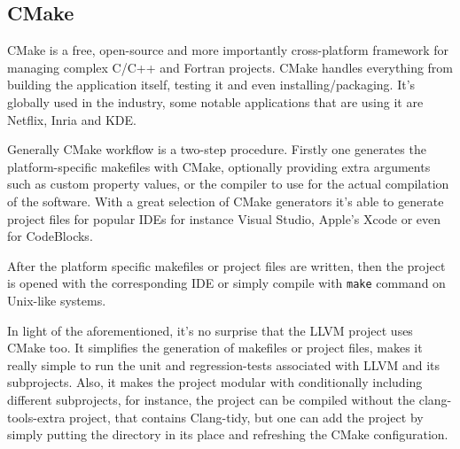\subsection{CMake}
\par CMake is a free, open-source and more importantly cross-platform framework for managing complex C/C++ and Fortran projects. CMake handles everything from building the application itself, testing it and even installing/packaging. It's globally used in the industry, some notable applications that are using it are Netflix, Inria and KDE\cite{cmake_homepage}. \medskip
\par Generally CMake workflow is a two-step procedure. Firstly one generates the platform-specific makefiles with CMake, optionally providing extra arguments such as custom property values, or the compiler to use for the actual compilation of the software. With a great selection of CMake generators it's able to generate project files for popular IDEs for instance Visual Studio, Apple's Xcode or even for CodeBlocks\cite{cmake_generator_doc}.
\par After the platform specific makefiles or project files are written, then the project is opened with the corresponding IDE or simply compile with \verb|make| command on Unix-like systems.
\par In light of the aforementioned, it's no surprise that the LLVM project uses CMake too. It simplifies the generation of makefiles or project files, makes it really simple to run the unit and regression-tests associated with LLVM and its subprojects. Also, it makes the project modular with conditionally including different subprojects, for instance, the project can be compiled without the clang-tools-extra project, that contains Clang-tidy, but one can add the project by simply putting the directory in its place and refreshing the CMake configuration. 
